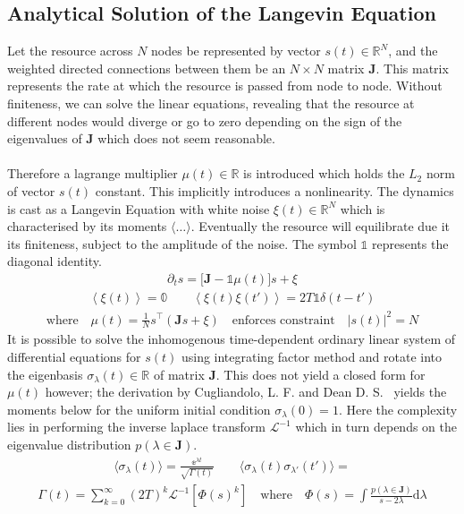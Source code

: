 \documentclass{article}[12pt]
\numberwithin{equation}{section}
\begin{document}
\subsection{Analytical Solution of the Langevin Equation}
Let the resource across $N$ nodes be represented by vector $s(t)\in\mathbb{R}^N$,
and the weighted directed connections between them be an $N\times N$ matrix
$\mathbf{J}$. This matrix represents the rate at which the resource is passed from
node to node. Without finiteness, we can solve the linear equations, revealing that
the resource at different nodes would diverge or go to zero depending on the sign
of the eigenvalues of $\mathbf{J}$ which does not seem reasonable.
\\\\
Therefore a
lagrange multiplier $\mu(t)\in\mathbb{R}$ is introduced which holds the $L_2$
norm of vector $s(t)$ constant. This implicitly introduces a nonlinearity. The
dynamics is cast as a Langevin Equation with white noise $\xi(t)\in\mathbb{R}^N$
which is characterised by its moments $\langle\dots\rangle$. Eventually the resource
will equilibrate due it its finiteness, subject to the amplitude of the noise.
The symbol $\mathbb{1}$ represents the diagonal identity.
\begin{align}
  \partial_t s = \big[\mathbf{J}-\mathbb{1}\mu(t)\big]s+\xi
\end{align}
\vspace{-40}
\begin{align}
  \left\langle\xi(t)\right\rangle=\mathbb{0}\qquad
  \left\langle\xi(t)\xi(t')\right\rangle=2T\mathbb{1}\delta(t-t')
\end{align}
\vspace{-40}
\begin{align}
\text{where}\quad\mu(t) = \frac{1}{N}s^{\top}\left(\mathbf{J}s+\xi\right)
\quad\text{enforces constraint}\quad|s(t)|^2=N
\label{eq:constraint}
\end{align}
It is possible to solve the inhomogenous time-dependent ordinary linear system of
differential equations for $s(t)$ using integrating factor method and rotate
into the eigenbasis $\sigma_{\lambda}(t)\in\mathbb{R}$ of matrix $\mathbf{J}$. This does not
yield a closed form for $\mu(t)$ however; the derivation by Cugliandolo, L. F.
and Dean D. S.~\cite{} yields the moments below for the uniform
initial condition $\sigma_{\lambda}(0)=1$. Here the complexity lies in performing
the inverse laplace transform $\mathcal{L}^{-1}$ which in turn depends on the
eigenvalue distribution $p(\lambda\in\mathbf{J})$.
\begin{align}
  \langle \sigma_{\lambda}(t)\rangle=
    \frac{\mathbb{e}^{\lambda t}}{\sqrt{\Gamma(t)}}\qquad
  \langle \sigma_{\lambda}(t)\sigma_{\lambda'}(t')\rangle=
\end{align}
\vspace{-30}
\begin{align}
  \Gamma(t)=
    \sum_{k=0}^{\infty}(2T)^k
    \mathcal{L}^{-1}\left[\Phi(s)^k\right]\quad\text{where}
    \quad
    \Phi(s)=\int\frac{p(\lambda\in\mathbf{J})}{s-2\lambda}\mathrm{d}\lambda
    \label{eq:gamma}
\end{align}
\pagebreak
\end{document}
